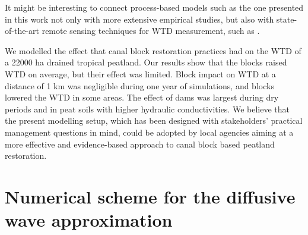 \documentclass[bg, manuscript]{copernicus}
\begin{document}
It might be interesting to connect process-based models such as the one presented in this work not only with more extensive empirical studies, but also with state-of-the-art remote sensing techniques for WTD measurement, such as \cite{hikouei2023}.

\conclusions  %
We modelled the effect that canal block restoration practices had on the WTD of a 22000 \unit{ha} drained tropical peatland.
Our results show that the blocks raised WTD on average, but their effect was limited.
Block impact on WTD at a distance of 1 \unit{km} was negligible during one year of simulations, and blocks lowered the WTD in some  areas.
The effect of dams was largest during dry periods and in peat soils with higher hydraulic conductivities.
We believe that the present modelling setup, which has been designed with stakeholders' practical management questions in mind, could be adopted by local agencies aiming at a more effective and evidence-based approach to canal block based peatland restoration.











\appendix
\section{Numerical scheme for the diffusive wave approximation} \label{ap-difwave}
\end{document}
